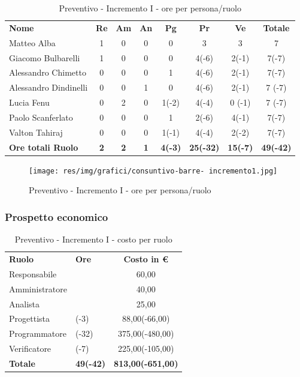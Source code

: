 \begin{table} [h!]
	\begin{center}
		\begin{tabular} { m{3.5cm} c c c c c c c }
			\rowcolor{lightgray}
			\textbf{Nome} & \textbf{Re} & \textbf{Am} & \textbf{An} & \textbf{Pg} & \textbf{Pr} & \textbf{Ve} & \textbf{Totale} \\
			Matteo Alba & 1 & 0 & 0 & 0 & 3 & 3 & 7 \\
			Giacomo Bulbarelli & 1 & 0 & 0 & 0 & 4(-6) & 2(-1) & 7(-7) \\
			Alessandro Chimetto & 0 & 0 & 0 & 1 & 4(-6) & 2(-1) & 7(-7) \\
			Alessandro Dindinelli & 0 & 0 & 1 & 0 & 4(-6) & 2(-1) & 7 (-7)\\
			Lucia Fenu & 0 & 2 & 0 & 1(-2) & 4(-4) & 0 (-1)& 7 (-7)\\
			Paolo Scanferlato & 0 & 0 & 0 & 1 & 2(-6) & 4(-1) & 7(-7) \\
			Valton Tahiraj & 0 & 0 & 0 & 1(-1) & 4(-4) & 2(-2) & 7(-7) \\
			\textbf{Ore totali Ruolo} & \textbf{2} & \textbf{2} & \textbf{1} & \textbf{4(-3)} & \textbf{25(-32)}& \textbf{15(-7)} & \textbf{49(-42)}
		\end{tabular}
		\caption{Preventivo - Incremento I - ore per persona/ruolo}
	\end{center}
\end{table}
\begin{figure} [h!]
	\centering
	\texttt{[image: res/img/grafici/consuntivo-barre- incremento1.jpg]}
	\caption{Preventivo - Incremento I - ore per persona/ruolo} 
\end{figure}

\newpage

\subsubsection{Prospetto economico}
\begin{table} [h!] %
	\begin{center}
		\begin{tabular} { m{3cm} >{\centering}m{1.5cm} c }
			\rowcolor{lightgray}
			\textbf{Ruolo} & \textbf{Ore} & \textbf{Costo in \euro} \\
			Responsabile & 2 & 60,00 \\
			Amministratore & 2 & 40,00 \\
			Analista & 1 & 25,00 \\
			Progettista & 4(-3) & 88,00(-66,00) \\
			Programmatore & 25(-32) & 375,00(-480,00) \\
			Verificatore & 15(-7) & 225,00(-105,00)\\
			\textbf{Totale} & \textbf{49(-42)} & \textbf{813,00(-651,00)} \\
		\end{tabular}
		\caption{Preventivo - Incremento I - costo per ruolo}
	\end{center}
\end{table}

